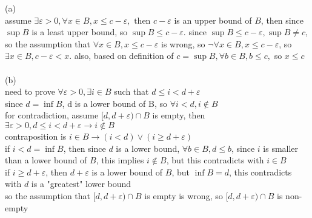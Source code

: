 \documentclass[12pt, border = 4pt, multi]{article} %
\begin{document}
(a)\\
assume $\exists \varepsilon > 0, \forall x \in B, x \leq c - \varepsilon, \text{ then } c - \varepsilon$ is an upper bound of $B$, then since $\sup B$ is a least upper bound, so $\sup B \leq c - \varepsilon$. since $\sup B \leq c - \varepsilon, \sup B \not= c$, so the assumption that $\forall x \in B, x \leq c - \varepsilon$ is wrong, so $\neg\forall x \in B, x \leq c - \varepsilon$, so $\exists x \in B, c - \varepsilon < x$. also, based on definition of $c = \sup B, \forall b \in B, b \leq c, $ so $x \leq c$\\
\\
(b)\\
need to prove $\forall \varepsilon > 0, \exists i \in B$ such that $d \leq i < d + \varepsilon$\\
since $d = \inf B$, d is a lower bound of B, so $\forall i < d, i \not\in B$\\
for contradiction, assume $[d, d + \varepsilon) \cap B$ is empty, then $\exists \varepsilon > 0, d \leq i < d + \varepsilon \longrightarrow i \not\in B$\\
contraposition is $i \in B \longrightarrow (i < d) \vee (i \geq d + \varepsilon)$\\
if $i < d = \inf B$, then since $d$ is a lower bound, $\forall b \in B, d \leq b$, since $i$ is smaller than a lower bound of $B$, this implies $i \not\in B$, but this contradicts with $i \in B$\\
if $i \geq d + \varepsilon$, then $d + \varepsilon$ is a lower bound of $B$, but $\inf B = d$, this contradicts with $d$ is a "greatest" lower bound\\
so the assumption that $[d, d + \varepsilon) \cap B$ is empty is wrong, so $[d, d + \varepsilon) \cap B$ is non-empty
\end{document}

